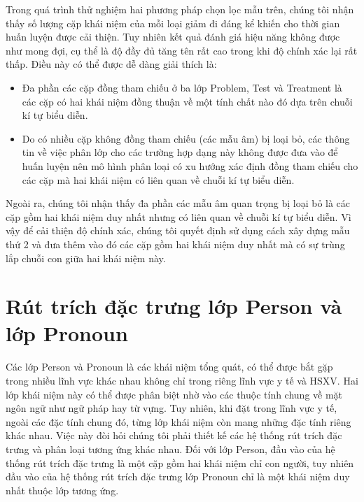 Trong quá trình thử nghiệm hai phương pháp chọn lọc mẫu trên, chúng tôi nhận thấy số lượng cặp khái niệm của mỗi loại giảm đi đáng kể khiến cho thời gian huấn luyện được cải thiện. Tuy nhiên kết quả đánh giá hiệu năng không được như mong đợi, cụ thể là độ đầy đủ tăng tên rất cao trong khi độ chính xác lại rất thấp. Điều này có thể được dễ dàng giải thích là:
\begin{itemize}
\item Đa phần các cặp đồng tham chiếu ở ba lớp Problem, Test và Treatment là các cặp có hai khái niệm đồng thuận về một tính chất nào đó dựa trên chuỗi kí tự biểu diễn.
\item Do có nhiều cặp không đồng tham chiếu (các mẫu âm) bị loại bỏ, các thông tin về việc phân lớp cho các trường hợp dạng này không được đưa vào để huấn luyện nên mô hình phân loại có xu hướng xác định đồng tham chiếu cho các cặp mà hai khái niệm có liên quan về chuỗi kí tự biểu diễn.
\end{itemize}

Ngoài ra, chúng tôi nhận thấy đa phần các mẫu âm quan trọng bị loại bỏ là các cặp gồm hai khái niệm duy nhất nhưng có liên quan về chuỗi kí tự biểu diễn. Vì vậy để cải thiện độ chính xác, chúng tôi quyết định sử dụng cách xây dựng mẫu thứ 2 và đưa thêm vào đó các cặp gồm hai khái niệm duy nhất mà có sự trùng lắp chuỗi con giữa hai khái niệm này.

\section{Rút trích đặc trưng lớp Person và lớp Pronoun}
Các lớp Person và Pronoun là các khái niệm tổng quát, có thể được bắt gặp trong nhiều lĩnh vực khác nhau không chỉ trong riêng lĩnh vực y tế và HSXV. Hai lớp khái niệm này có thể được phân biệt nhờ vào các thuộc tính chung về mặt ngôn ngữ như ngữ pháp hay từ vựng. Tuy nhiên, khi đặt trong lĩnh vực y tế, ngoài các đặc tính chung đó, từng lớp khái niệm còn mang những đặc tính riêng khác nhau. Việc này đòi hỏi chúng tôi phải thiết kế các hệ thống rút trích đặc trưng và phân loại tương ứng khác nhau. Đối với lớp Person, đầu vào của hệ thống rút trích đặc trưng là một cặp gồm hai khái niệm chỉ con người, tuy nhiên đầu vào của hệ thống rút trích đặc trưng lớp Pronoun chỉ là một khái niệm duy nhất thuộc lớp tương ứng.


